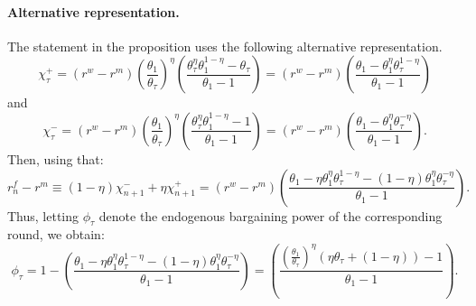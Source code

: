 \paragraph{Alternative representation.}

{ The statement in the proposition uses the following
alternative representation.
\[
\chi_{\tau}^{+}=\left(r^{w}-r^{m}\right)\left(\frac{\theta_{1}}{\theta_{\tau}}\right)^{\eta}\left(\frac{\theta_{\tau}^{\eta}\theta_{1}^{1-\eta}-\theta_{\tau}}{\theta_{1}-1}\right)=\left(r^{w}-r^{m}\right)\left(\frac{\theta_{1}-\theta_{1}^{\eta}\theta_{\tau}^{1-\eta}}{\theta_{1}-1}\right)
\]
and
\[
\chi_{\tau}^{-}=\left(r^{w}-r^{m}\right)\left(\frac{\theta_{1}}{\theta_{\tau}}\right)^{\eta}\left(\frac{\theta_{\tau}^{\eta}\theta_{1}^{1-\eta}-1}{\theta_{1}-1}\right)=\left(r^{w}-r^{m}\right)\left(\frac{\theta_{1}-\theta_{1}^{\eta}\theta_{\tau}^{-\eta}}{\theta_{1}-1}\right).
\]
Then, using that:
\[
r_{n}^{f}-r^{m}\equiv\left(1-\eta\right)\chi_{n+1}^{-}+\eta\chi_{n+1}^{+}=\left(r^{w}-r^{m}\right)\left(\frac{\theta_{1}-\eta\theta_{1}^{\eta}\theta_{\tau}^{1-\eta}-\left(1-\eta\right)\theta_{1}^{\eta}\theta_{\tau}^{-\eta}}{\theta_{1}-1}\right).
\]
Thus, letting $\phi_{\tau}$ denote the endogenous bargaining power
of the corresponding round, we obtain:
\[
\phi_{\tau}=1-\left(\frac{\theta_{1}-\eta\theta_{1}^{\eta}\theta_{\tau}^{1-\eta}-\left(1-\eta\right)\theta_{1}^{\eta}\theta_{\tau}^{-\eta}}{\theta_{1}-1}\right)=\left(\frac{\left(\frac{\theta_{1}}{\theta_{\tau}}\right)^{\eta}\left(\eta\theta_{\tau}+\left(1-\eta\right)\right)-1}{\theta_{1}-1}\right).
\]
}




